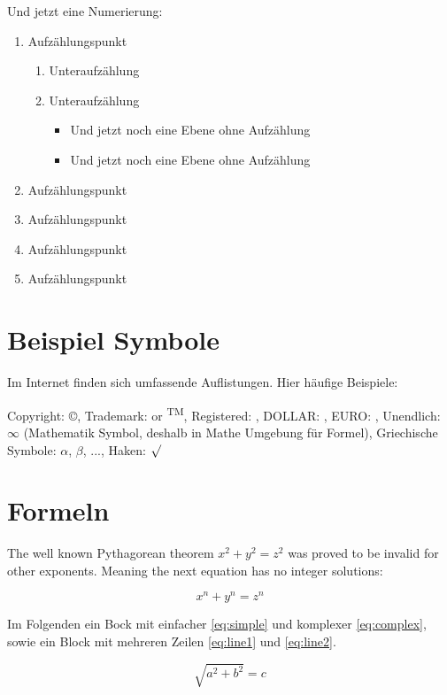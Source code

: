 Und jetzt eine Numerierung:

\begin{enumerate}
	\item Aufzählungspunkt
	      \begin{enumerate}
		      \item Unteraufzählung
		      \item Unteraufzählung
		            \begin{itemize}
			            \item Und jetzt noch eine Ebene ohne Aufzählung
			            \item Und jetzt noch eine Ebene ohne Aufzählung
		            \end{itemize}
	      \end{enumerate}
	\item Aufzählungspunkt
	\item Aufzählungspunkt
	\item Aufzählungspunkt
	\item Aufzählungspunkt
\end{enumerate}

\section{Beispiel Symbole}

Im Internet finden sich umfassende Auflistungen. Hier häufige
Beispiele:

Copyright: \copyright{}, Trademark: \texttrademark{} or \textsuperscript{TM},
Registered: \textregistered{}, DOLLAR: \textdollar{}, EURO: \texteuro{},
Unendlich: \(\infty\) (Mathematik Symbol, deshalb in Mathe Umgebung für Formel), Griechische Symbole: \(\alpha\), \(\beta\), ..., Haken: \(\surd\)

\section{Formeln}

The well known Pythagorean theorem \(x^2 + y^2 = z^2\) was
proved to be invalid for other exponents.
Meaning the next equation has no integer solutions:

\[ x^n + y^n = z^n \]

Im Folgenden ein Bock mit einfacher \cref{eq:simple} und komplexer \cref{eq:complex}, sowie ein Block mit mehreren Zeilen \cref{eq:line1} und \cref{eq:line2}.

\begin{equation}
	\sqrt{a^2 + b^2} = c
	\label{eq:simple}
\end{equation}


